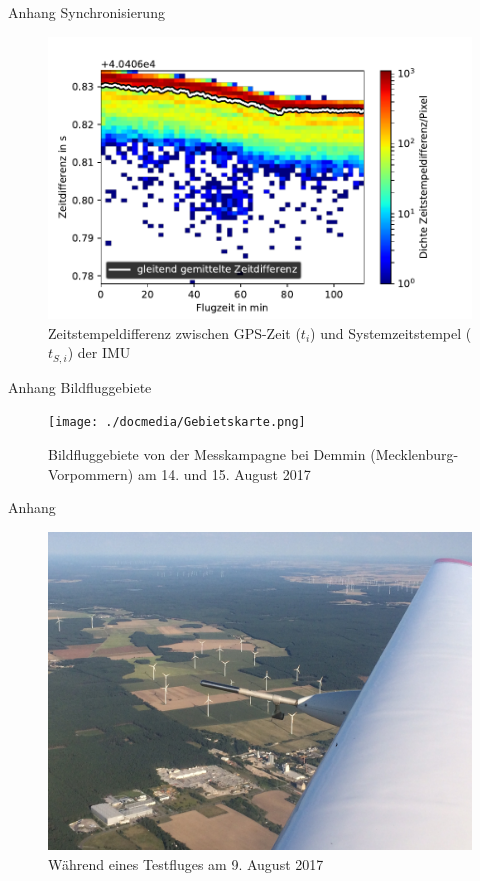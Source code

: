 \documentclass[ucs,9pt]{beamer}
\begin{document}
\begin{frame}{Anhang}
	Synchronisierung
	\begin{figure}
		\includegraphics[width=.8\textwidth]{./docmedia/nova0_jitter.pdf}
		\caption{Zeitstempeldifferenz zwischen GPS-Zeit ($t_i$) und Systemzeitstempel ($t_{S,i}$) der IMU}
	\end{figure}
\end{frame}

\begin{frame}{Anhang}
	Bildfluggebiete
	\begin{figure}
		\texttt{[image: ./docmedia/Gebietskarte.png]}
		\caption{Bildfluggebiete von der Messkampagne bei Demmin (Mecklenburg-Vorpommern) am 14. und 15. August 2017}
	\end{figure}
\end{frame}

\begin{frame}{Anhang}
	\begin{figure}
		\includegraphics[width=.8\textwidth]{./docmedia/probe_inflight.jpg}
		\caption{Während eines Testfluges am 9. August 2017}
	\end{figure}
\end{frame}
\end{document}
